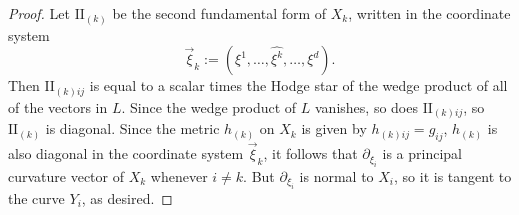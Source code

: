 \documentclass[reqno,11pt]{amsart}
\newcommand{\Two}{\mathrm{I\!I}}
\theoremstyle{definition}
\begin{document}
\begin{proof}
Let $\Two_{(k)}$ be the second fundamental form of $X_k$, written in the coordinate system
$$\vec \xi_k := (\xi^1, \dots, \widehat{\xi^k}, \dots, \xi^d).$$
Then $\Two_{(k)ij}$ is equal to a scalar times the Hodge star of the wedge product of all of the vectors in $L$.
Since the wedge product of $L$ vanishes, so does $\Two_{(k)ij}$, so $\Two_{(k)}$ is diagonal.
Since the metric $h_{(k)}$ on $X_k$ is given by $h_{(k)ij} = g_{ij}$, $h_{(k)}$ is also diagonal in the coordinate system $\vec \xi_k$, it follows that $\partial_{\xi_i}$ is a principal curvature vector of $X_k$ whenever $i \neq k$.
But $\partial_{\xi_i}$ is normal to $X_i$, so it is tangent to the curve $Y_i$, as desired.
\end{proof}


\printbibliography
\end{document}
